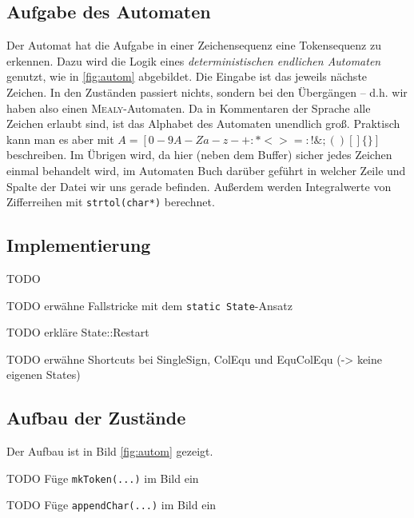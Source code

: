 \documentclass[
a4paper,   %
11pt,      %
oneside,   %
onecolumn, %
final      %
]{article}
\newcommand{\code}[1]{\lstinline$#1$}
\begin{document}
\subsection{Aufgabe des Automaten}
Der Automat hat die Aufgabe in einer Zeichensequenz eine Tokensequenz zu erkennen.
Dazu wird die Logik eines \emph{deterministischen endlichen Automaten} genutzt, wie in \ref{fig:autom} abgebildet.
Die Eingabe ist das jeweils nächste Zeichen.
In den Zuständen passiert nichts, sondern bei den Übergängen -- d.h. wir haben also einen \textsc{Mealy}-Automaten.
Da in Kommentaren der Sprache alle Zeichen erlaubt sind, ist das Alphabet des Automaten unendlich groß.
Praktisch kann man es aber mit $A = [0-9A-Za-z-+:*<>=:!\&;()[]\{\}]$ beschreiben.
Im Übrigen wird, da hier (neben dem Buffer) sicher jedes Zeichen einmal behandelt wird, im Automaten Buch darüber geführt in welcher Zeile und Spalte der Datei wir uns gerade befinden.
Außerdem werden Integralwerte von Zifferreihen mit \code{strtol(char*)} berechnet.

\subsection{Implementierung}
TODO

TODO erwähne Fallstricke mit dem \code{static State}-Ansatz

TODO erkläre State::Restart

TODO erwähne Shortcuts bei SingleSign, ColEqu und EquColEqu (-> keine eigenen States)

\subsection{Aufbau der Zustände}

Der Aufbau ist in Bild \ref{fig:autom} gezeigt.

TODO Füge \code{mkToken(...)} im Bild ein

TODO Füge \code{appendChar(...)} im Bild ein

\end{document}
